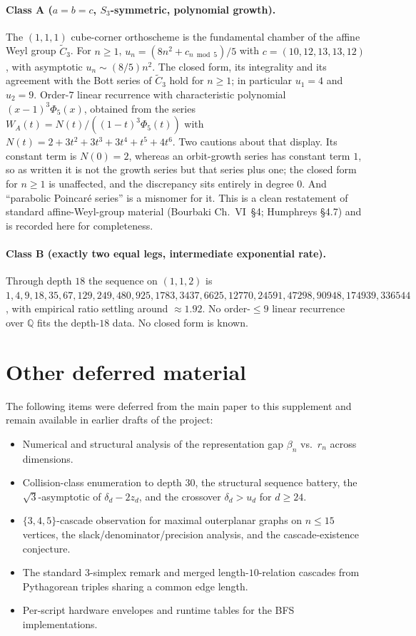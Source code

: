 \documentclass[11pt,a4paper]{article}
\theoremstyle{remark}
\theoremstyle{plain}
\begin{document}
\paragraph{Class A ($a = b = c$, $S_3$-symmetric, polynomial growth).}
The $(1, 1, 1)$ cube-corner orthoscheme is the fundamental chamber of
the affine Weyl group $\widetilde{C}_3$.  For $n \ge 1$,
$u_n = (8 n^2 + c_{n \bmod 5})/5$ with $c = (10, 12, 13, 13, 12)$, with
asymptotic $u_n \sim (8/5) n^2$.  The closed form, its integrality and
its agreement with the Bott series of $\widetilde{C}_3$ hold for
$n \ge 1$; in particular $u_1 = 4$ and $u_2 = 9$. Order-$7$ linear
recurrence with characteristic polynomial $(x-1)^3 \Phi_5(x)$, obtained
from the series $W_A(t) = N(t) / ((1-t)^3 \Phi_5(t))$ with
$N(t) = 2 + 3t^2 + 3t^3 + 3t^4 + t^5 + 4t^6$. Two cautions about that
display. Its constant term is $N(0) = 2$, whereas an orbit-growth series
has constant term $1$, so as written it is not the growth series but
that series plus one; the closed form for $n \ge 1$ is unaffected, and
the discrepancy sits entirely in degree $0$. And ``parabolic Poincar\'e
series'' is a misnomer for it. This is a clean
restatement of standard affine-Weyl-group material (Bourbaki Ch.~VI~§4;
Humphreys \S4.7) and is recorded here for completeness.

\paragraph{Class B (exactly two equal legs, intermediate exponential rate).}
Through depth $18$ the sequence on $(1, 1, 2)$ is
$1, 4, 9, 18, 35, 67, 129, 249, 480, 925, 1783, 3437, 6625, 12770,
24591, 47298, 90948, 174939, 336544$, with empirical ratio settling
around $\approx 1.92$.  No order-$\le 9$ linear recurrence over
$\mathbb{Q}$ fits the depth-$18$ data.  No closed form is known.

\section{Other deferred material}
\label{sec:deferred}

The following items were deferred from the main paper to this
supplement and remain available in earlier drafts of the project:
\begin{itemize}[leftmargin=*,itemsep=0.15em]
\item Numerical and structural analysis of the representation gap
$\beta_n$ vs.\ $r_n$ across dimensions.
\item Collision-class enumeration to depth $30$, the structural
sequence battery, the $\sqrt{3}$-asymptotic of $\delta_d - 2 z_d$, and
the crossover $\delta_d > u_d$ for $d \ge 24$.
\item $\{3, 4, 5\}$-cascade observation for maximal outerplanar graphs
on $n \le 15$ vertices, the slack/denominator/precision analysis, and
the cascade-existence conjecture.
\item The standard 3-simplex remark and merged length-$10$-relation
cascades from Pythagorean triples sharing a common edge length.
\item Per-script hardware envelopes and runtime tables for the BFS
implementations.
\end{itemize}
\end{document}
